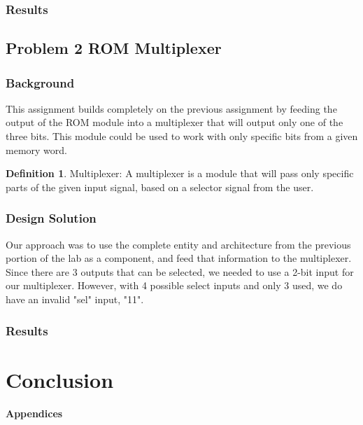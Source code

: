 \documentclass[11pt]{article}
\begin{document}
\subsubsection{Results}

\subsection{Problem 2 ROM Multiplexer}

\subsubsection{Background}
This assignment builds completely on the previous assignment by feeding the output of the ROM module into a multiplexer that will output only one of the three bits. This module could be used to work with only specific bits from a given memory word.

\theoremstyle{definition}
\newtheorem{definition}{Definition}
\begin{definition}
Multiplexer: A multiplexer is a module that will pass only specific parts of the given input signal, based on a selector signal from the user.
\end{definition}

\subsubsection{Design Solution}
Our approach was to use the complete entity and architecture from the previous portion of the lab as a component, and feed that information to the multiplexer. Since there are 3 outputs that can be selected, we needed to use a 2-bit input for our multiplexer. However, with 4 possible select inputs and only 3 used, we do have an invalid "sel" input, "11".

\subsubsection{Results}

\section{Conclusion}

\pagebreak

\textbf{Appendices}
\end{document}
